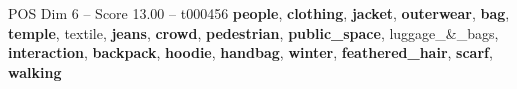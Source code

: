 \begin{textsample}{POS Dim 6 – Score 13.00 – t000456}  \label{ex:f6_pos_013}
\textbf{people}, \textbf{clothing}, \textbf{jacket}, \textbf{outerwear}, \textbf{bag}, \textbf{temple}, textile, \textbf{jeans}, \textbf{crowd}, \textbf{pedestrian}, \textbf{public\_space}, luggage\_\&\_bags, \textbf{interaction}, \textbf{backpack}, \textbf{hoodie}, \textbf{handbag}, \textbf{winter}, \textbf{feathered\_hair}, \textbf{scarf}, \textbf{walking}

\end{textsample}
